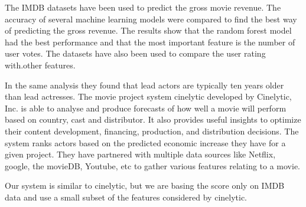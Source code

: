 
The IMDB datasets have been used to predict the gross movie revenue\cite{JaeHuang}. The accuracy of several machine learning models were compared to find the best way of predicting the gross revenue. The results show that the random forest model had the best performance and that the most important feature is the number of user votes. The datasets have also been used to compare the user rating with.other features\cite{MaxWoolf}.

In the same analysis they found that lead actors are typically ten years older than lead actresses. The movie project system cinelytic developed by Cinelytic, Inc.\cite{Cinelytic} is able to analyse and produce forecasts of how well a movie will perform based on country, cast and distributor. It also provides useful insights to optimize their content development, financing, production, and distribution decisions. The system ranks actors based on the predicted economic increase they have for a given project. They have partnered with multiple data sources like Netflix, google, the movieDB, Youtube, etc to gather various features relating to a movie.

Our system is similar to cinelytic, but we are basing the score only on IMDB data and use a small subset of the features considered by cinelytic.